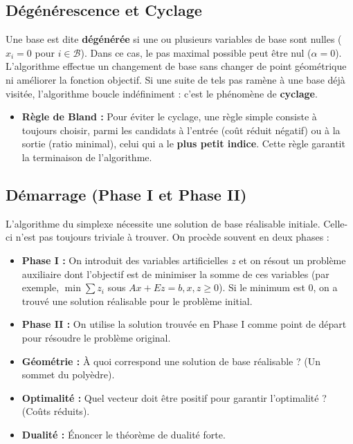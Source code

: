 \subsection{Dégénérescence et Cyclage}
Une base est dite \textbf{dégénérée} si une ou plusieurs variables de base sont nulles ($x_i = 0$ pour $i \in \mathcal{B}$). 
Dans ce cas, le pas maximal possible peut être nul ($\alpha = 0$). L'algorithme effectue un changement de base sans changer de point géométrique ni améliorer la fonction objectif.
Si une suite de tels pas ramène à une base déjà visitée, l'algorithme boucle indéfiniment : c'est le phénomène de \textbf{cyclage}.
\begin{itemize}
    \item \textbf{Règle de Bland :} Pour éviter le cyclage, une règle simple consiste à toujours choisir, parmi les candidats à l'entrée (coût réduit négatif) ou à la sortie (ratio minimal), celui qui a le \textbf{plus petit indice}. Cette règle garantit la terminaison de l'algorithme.
\end{itemize}

\subsection{Démarrage (Phase I et Phase II)}
L'algorithme du simplexe nécessite une solution de base réalisable initiale. Celle-ci n'est pas toujours triviale à trouver. On procède souvent en deux phases :
\begin{itemize}
    \item \textbf{Phase I :} On introduit des variables artificielles $z$ et on résout un problème auxiliaire dont l'objectif est de minimiser la somme de ces variables (par exemple, $\min \sum z_i$ sous $Ax + Ez = b, x,z \ge 0$). Si le minimum est 0, on a trouvé une solution réalisable pour le problème initial.
    \item \textbf{Phase II :} On utilise la solution trouvée en Phase I comme point de départ pour résoudre le problème original.
\end{itemize}

\bigskip
\begin{checkpoint}
\begin{itemize}
    \item \textbf{Géométrie :} À quoi correspond une solution de base réalisable ? (Un sommet du polyèdre).
    \item \textbf{Optimalité :} Quel vecteur doit être positif pour garantir l'optimalité ? (Coûts réduits).
    \item \textbf{Dualité :} Énoncer le théorème de dualité forte.
\end{itemize}
\end{checkpoint}
